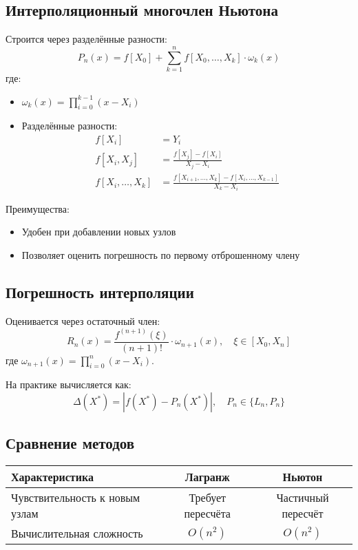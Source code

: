 \subsection*{Интерполяционный многочлен Ньютона}
Строится через разделённые разности:
\[ P_n(x) = f[X_0] + \sum_{k=1}^n f[X_0,\ldots,X_k] \cdot \omega_k(x) \]
где:
\begin{itemize}
\item $\omega_k(x) = \prod_{i=0}^{k-1}(x-X_i)$
\item Разделённые разности:
\begin{align*}
f[X_i] &= Y_i \\
f[X_i,X_j] &= \frac{f[X_j]-f[X_i]}{X_j-X_i} \\
f[X_i,\ldots,X_k] &= \frac{f[X_{i+1},\ldots,X_k]-f[X_i,\ldots,X_{k-1}]}{X_k-X_i}
\end{align*}
\end{itemize}

Преимущества:
\begin{itemize}
\item Удобен при добавлении новых узлов
\item Позволяет оценить погрешность по первому отброшенному члену
\end{itemize}

\subsection*{Погрешность интерполяции}
Оценивается через остаточный член:
\[ R_n(x) = \frac{f^{(n+1)}(\xi)}{(n+1)!} \cdot \omega_{n+1}(x), \quad \xi \in [X_0,X_n] \]
где $\omega_{n+1}(x) = \prod_{i=0}^n (x-X_i)$.

На практике вычисляется как:
\[ \Delta(X^*) = |f(X^*) - P_n(X^*)|, \quad P_n \in \{L_n, P_n\} \]

\subsection*{Сравнение методов}
\begin{center}
\begin{tabular}{|l|c|c|}
\hline
Характеристика & Лагранж & Ньютон \\
\hline
Чувствительность к новым узлам & Требует пересчёта & Частичный пересчёт \\
Вычислительная сложность & $O(n^2)$ & $O(n^2)$ \\
\hline
\end{tabular}
\end{center}

